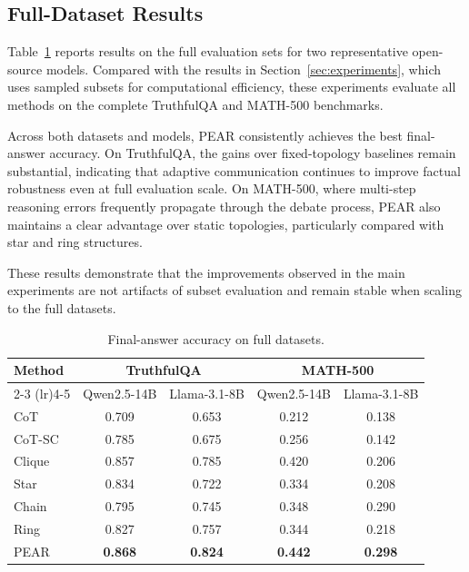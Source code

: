 \subsection{Full-Dataset Results}
\label{app:full-results}

Table~\ref{tab:full-results} reports results on the full evaluation sets for two representative open-source models. Compared with the results in Section~\ref{sec:experiments}, which uses sampled subsets for computational efficiency, these experiments evaluate all methods on the complete TruthfulQA and MATH-500 benchmarks.

Across both datasets and models, PEAR consistently achieves the best final-answer accuracy. On TruthfulQA, the gains over fixed-topology baselines remain substantial, indicating that adaptive communication continues to improve factual robustness even at full evaluation scale. On MATH-500, where multi-step reasoning errors frequently propagate through the debate process, PEAR also maintains a clear advantage over static topologies, particularly compared with star and ring structures.

These results demonstrate that the improvements observed in the main experiments are not artifacts of subset evaluation and remain stable when scaling to the full datasets.


\begin{table}[h]
\centering
\scriptsize
\setlength{\tabcolsep}{3pt}
\renewcommand{\arraystretch}{1.05}
\caption{
Final-answer accuracy on full datasets.
}
\label{tab:full-results}
\begin{tabular}{lcccc}
\toprule
\textbf{Method}
& \multicolumn{2}{c}{\textbf{TruthfulQA}}
& \multicolumn{2}{c}{\textbf{MATH-500}} \\
\cmidrule(lr){2-3}
\cmidrule(lr){4-5}
& Qwen2.5-14B & Llama-3.1-8B
& Qwen2.5-14B & Llama-3.1-8B \\
\midrule
CoT
& 0.709 & 0.653
& 0.212 & 0.138 \\

CoT-SC
& 0.785 & 0.675
& 0.256 & 0.142 \\

Clique
& 0.857 & 0.785
& 0.420 & 0.206 \\

Star
& 0.834 & 0.722
& 0.334 & 0.208 \\

Chain
& 0.795 & 0.745
& 0.348 & 0.290 \\

Ring
& 0.827 & 0.757
& 0.344 & 0.218 \\

PEAR
& \textbf{0.868} & \textbf{0.824}
& \textbf{0.442} & \textbf{0.298} \\
\bottomrule
\end{tabular}
\end{table}


